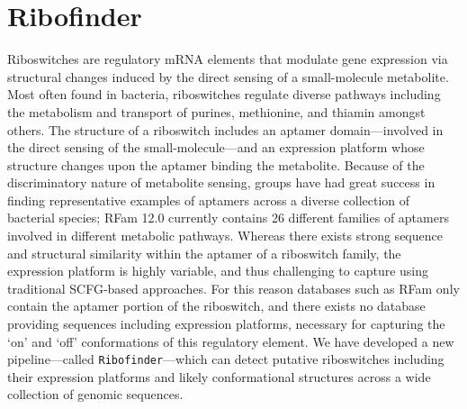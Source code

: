 
\yyyymmdddate
\renewcommand{\dateseparator}{-}
\newcommand{\tabitem}{~~\llap{\textbullet}~~}

\renewcommand*\ttdefault{txtt}
\newcommand{\ms}[1]{\mbox{\tt #1}\xspace}
\newcommand{\seq}{{\bf s}\xspace}
\newcommand{\strS}{{\mathcal S}\xspace}
\newcommand{\strOff}{\ensuremath{{\mathcal S}_{\text{off}}}\xspace}
\newcommand{\strOn}{\ensuremath{{\mathcal S}_{\text{on}}}\xspace}
\newcommand{\strConst}[1]{\ensuremath{{\mathcal C}_{\text{#1}}}\xspace}
\newcommand{\tree}{{\mathcal T}\xspace}
\newcommand{\treeFor}[1]{\ensuremath{{\mathcal T}_{\text #1}}}
\newcommand{\fnaRetrievalTime}{\formatdate{25}{11}{2014} at \formattime{9}{14}{0}}
\newcommand{\textdown}[2]{\ensuremath{{\text{#1}}_{\text{#2}}}}
\newcommand{\treePos}[2]{\textdown{\ms{#1}}{#2}}
\newcommand{\treeIdx}[3]{\treePos{#1}{#2}\ensuremath{(#3)}}

\newcommand{\rfinder}{\ms{Ribofinder}}
\newcommand{\infernal}{\ms{Infernal}}
\newcommand{\tthp}{\ms{TransTermHP}}
\newcommand{\rshapes}{\ms{RNAshapes}}
\newcommand{\rfold}{\ms{RNAfold}}
\newcommand{\foldalign}{\ms{FoldAlign}}

\chapter{Ribofinder} %

\label{Ribofinder} %


Riboswitches are regulatory mRNA elements that modulate gene expression via structural changes induced by the direct sensing of a small-molecule metabolite. Most often found in bacteria, riboswitches regulate diverse pathways including the metabolism and transport of purines, methionine, and thiamin amongst others. The structure of a riboswitch includes an aptamer domain---involved in the direct sensing of the small-molecule---and an expression platform whose structure changes upon the aptamer binding the metabolite. Because of the discriminatory nature of metabolite sensing, groups have had great success in finding representative examples of aptamers across a diverse collection of bacterial species; RFam 12.0 currently contains 26 different families of aptamers involved in different metabolic pathways. Whereas there exists strong sequence and structural similarity within the aptamer of a riboswitch family, the expression platform is highly variable, and thus challenging to capture using traditional SCFG-based approaches. For this reason databases such as RFam only contain the aptamer portion of the riboswitch, and there exists no database providing sequences including expression platforms, necessary for capturing the `on' and `off' conformations of this regulatory element. We have developed a new pipeline---called \rfinder---which can detect putative riboswitches including their expression platforms and likely conformational structures across a wide collection of genomic sequences.


